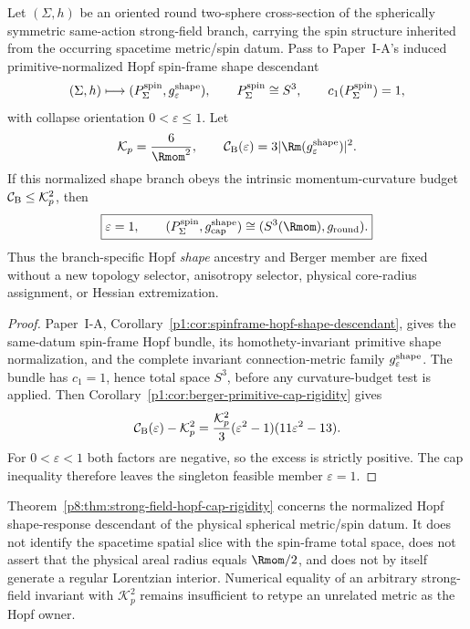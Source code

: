 \documentclass[12pt,a4paper]{article}
\begin{document}
\begin{theorem}
\label{p8:thm:strong-field-hopf-cap-rigidity}
Let \((\Sigma,h)\) be an oriented round two-sphere cross-section of the
spherically symmetric same-action strong-field branch, carrying the spin
structure inherited from the occurring spacetime metric/spin datum.  Pass to
Paper~I-A's induced primitive-normalized Hopf spin-frame shape descendant
\[
 (\Sigma,h)
 \longmapsto
 (P_{\Sigma}^{\rm spin},g_{\varepsilon}^{\rm shape}),
 \qquad
 P_{\Sigma}^{\rm spin}\cong S^3,
 \qquad
 c_1(P_{\Sigma}^{\rm spin})=1,
\]
with collapse orientation \(0<\varepsilon\le1\).  Let
\[
 \mathcal K_p=\frac6{\Rmom^2},
 \qquad
 \mathcal C_{\rm B}(\varepsilon)
 =3\lvert\Rm(g_{\varepsilon}^{\rm shape})\rvert^2 .
\]
If this normalized shape branch obeys the intrinsic momentum-curvature budget
\(\mathcal C_{\rm B}\le\mathcal K_p^2\), then
\begin{equation}
\label{p8:eq:strong-field-hopf-cap-rounding}
 \boxed{\varepsilon=1,
 \qquad
 (P_{\Sigma}^{\rm spin},g_{\rm cap}^{\rm shape})
 \cong(S^3(\Rmom),g_{\rm round}).}
\end{equation}
Thus the branch-specific Hopf \emph{shape} ancestry and Berger member are fixed
without a new topology selector, anisotropy selector, physical core-radius
assignment, or Hessian extremization.
\end{theorem}

\begin{proof}
Paper~I-A,
Corollary~\ref{p1:cor:spinframe-hopf-shape-descendant}, gives the same-datum
spin-frame Hopf bundle, its homothety-invariant primitive shape normalization,
and the complete invariant connection-metric family
\(g_{\varepsilon}^{\rm shape}\).  The bundle has \(c_1=1\), hence total space
\(S^3\), before any curvature-budget test is applied.  Then
Corollary~\ref{p1:cor:berger-primitive-cap-rigidity} gives
\[
 \mathcal C_{\rm B}(\varepsilon)-\mathcal K_p^2
 =\frac{\mathcal K_p^2}{3}
   (\varepsilon^2-1)(11\varepsilon^2-13).
\]
For \(0<\varepsilon<1\) both factors are negative, so the excess is strictly
positive.  The cap inequality therefore leaves the singleton feasible member
\(\varepsilon=1\).
\end{proof}

\begin{remark}
\label{p8:rem:strong-field-cap-owner-firewall}
Theorem~\ref{p8:thm:strong-field-hopf-cap-rigidity} concerns the normalized
Hopf shape-response descendant of the physical spherical metric/spin datum.
It does not identify the spacetime spatial slice with the spin-frame total
space, does not assert that the physical areal radius equals \(\Rmom/2\), and
does not by itself generate a regular Lorentzian interior.  Numerical equality
of an arbitrary strong-field invariant with \(\mathcal K_p^2\) remains
insufficient to retype an unrelated metric as the Hopf owner.
\end{remark}
\end{document}
